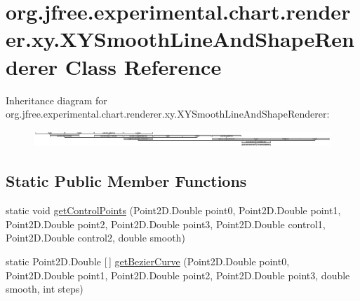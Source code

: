\hypertarget{classorg_1_1jfree_1_1experimental_1_1chart_1_1renderer_1_1xy_1_1_x_y_smooth_line_and_shape_renderer}{}\section{org.\+jfree.\+experimental.\+chart.\+renderer.\+xy.\+X\+Y\+Smooth\+Line\+And\+Shape\+Renderer Class Reference}
\label{classorg_1_1jfree_1_1experimental_1_1chart_1_1renderer_1_1xy_1_1_x_y_smooth_line_and_shape_renderer}
Inheritance diagram for org.\+jfree.\+experimental.\+chart.\+renderer.\+xy.\+X\+Y\+Smooth\+Line\+And\+Shape\+Renderer\+:\begin{figure}[H]
\begin{center}
\leavevmode
\includegraphics[height=0.626398cm]{classorg_1_1jfree_1_1experimental_1_1chart_1_1renderer_1_1xy_1_1_x_y_smooth_line_and_shape_renderer}
\end{center}
\end{figure}
\subsection*{Static Public Member Functions}
\begin{DoxyCompactItemize}
\item 
static void \mbox{\hyperlink{classorg_1_1jfree_1_1experimental_1_1chart_1_1renderer_1_1xy_1_1_x_y_smooth_line_and_shape_renderer_a6bd28c2a7130303c8ede75b17826441a}{get\+Control\+Points}} (Point2\+D.\+Double point0, Point2\+D.\+Double point1, Point2\+D.\+Double point2, Point2\+D.\+Double point3, Point2\+D.\+Double control1, Point2\+D.\+Double control2, double smooth)
\item 
static Point2\+D.\+Double \mbox{[}$\,$\mbox{]} \mbox{\hyperlink{classorg_1_1jfree_1_1experimental_1_1chart_1_1renderer_1_1xy_1_1_x_y_smooth_line_and_shape_renderer_a90218f664fa6196a182d044577c882ce}{get\+Bezier\+Curve}} (Point2\+D.\+Double point0, Point2\+D.\+Double point1, Point2\+D.\+Double point2, Point2\+D.\+Double point3, double smooth, int steps)
\end{DoxyCompactItemize}
